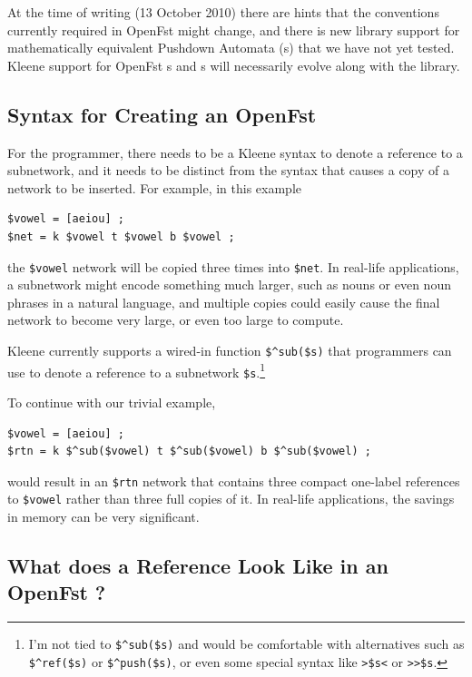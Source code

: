 At the time of writing (13 October 2010) there are hints that the
 conventions currently required in OpenFst might change, and
there is new library support for mathematically equivalent Pushdown
Automata (s) that we have not yet tested.  Kleene support for
OpenFst s and s will necessarily evolve along with
the library.

\subsection{Syntax for Creating an OpenFst }

For the programmer, there needs to be a Kleene syntax to denote a
reference to a subnetwork, and it needs to be distinct from the syntax
that causes a copy of a network to be inserted.  For example, in this
example

\begin{Verbatim}[fontsize=\small]
$vowel = [aeiou] ;
$net = k $vowel t $vowel b $vowel ;
\end{Verbatim}

\noindent
the \verb!$vowel! network will be copied three times into \verb!$net!.
In real-life applications, a subnetwork might encode something much
larger, such as nouns or even noun phrases in a natural language, and
multiple copies could easily cause the final network to become very
large, or even too large to compute.

Kleene currently supports a wired-in function \verb!$^sub($s)! that
programmers can use to denote a reference to a subnetwork \verb!$s!.\footnote{I'm
not tied to \verb!$^sub($s)! and would be comfortable with alternatives such
as \verb!$^ref($s)! or \verb!$^push($s)!, or even some special syntax like
\verb!>$s<! or \verb!>>$s!.} 

To continue with our trivial example, 

\begin{Verbatim}[fontsize=\small]
$vowel = [aeiou] ;
$rtn = k $^sub($vowel) t $^sub($vowel) b $^sub($vowel) ;
\end{Verbatim}

\noindent
would result in an \verb!$rtn! network that contains three compact
one-label references to \verb!$vowel! rather than three full copies of
it.  In real-life applications, the savings in memory can be very
significant.

\subsection{What does a Reference Look Like in an OpenFst ?}

